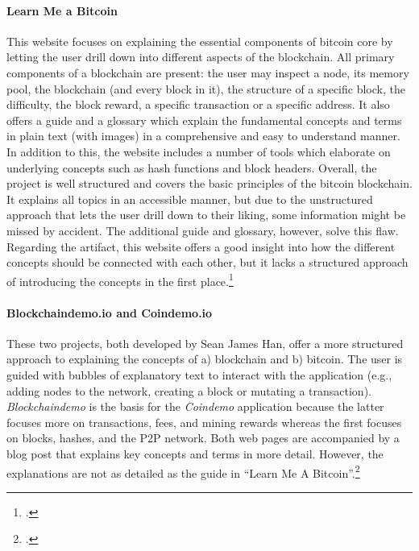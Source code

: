 \paragraph{Learn Me a Bitcoin} This website focuses on explaining the essential components of bitcoin core by letting the user drill down into different aspects of the blockchain. All primary components of a blockchain are present: the user may inspect a node, its memory pool, the blockchain (and every block in it), the structure of a specific block, the difficulty, the block reward, a specific transaction or a specific address. It also offers a guide and a glossary which explain the fundamental concepts and terms in plain text (with images) in a comprehensive and easy to understand manner. In addition to this, the website includes a number of tools which elaborate on underlying concepts such as hash functions and block headers. Overall, the project is well structured and covers the basic principles of the bitcoin blockchain. It explains all topics in an accessible manner, but due to the unstructured approach that lets the user drill down to their liking, some information might be missed by accident. The additional guide and glossary, however, solve this flaw. Regarding the artifact, this website offers a good insight into how the different concepts should be connected with each other, but it lacks a structured approach of introducing the concepts in the first place.\footcite[Cf.][]{WalkerLearnmeBitcoin2016}

\paragraph{Blockchaindemo.io and Coindemo.io} These two projects, both developed by Sean James Han, offer a more structured approach to explaining the concepts of a) blockchain and b) bitcoin. The user is guided with bubbles of explanatory text to interact with the application (e.g., adding nodes to the network, creating a block or mutating a transaction). \textit{Blockchaindemo} is the basis for the \textit{Coindemo} application because the latter focuses more on transactions, fees, and mining rewards whereas the first focuses on blocks, hashes, and the P2P network. Both web pages are accompanied by a blog post that explains key concepts and terms in more detail. However, the explanations are not as detailed as the guide in \enquote{Learn Me A Bitcoin}.\footcites[Cf.][]{HanHowdoesblockchain2017}[cf.][]{HanBlockchainDemo2017}[cf.][]{HanHowdoesbitcoin2017}[cf.][]{HanCoinDemo2017}


